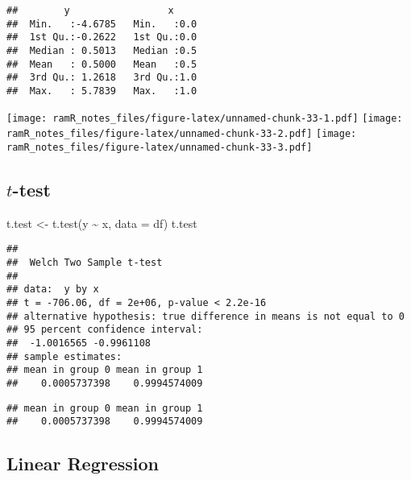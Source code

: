 \documentclass[
]{book}
\newenvironment{Shaded}{\begin{snugshade}}{\end{snugshade}}
\newcommand{\AttributeTok}[1]{\textcolor[rgb]{0.77,0.63,0.00}{#1}}
\newcommand{\FunctionTok}[1]{\textcolor[rgb]{0.00,0.00,0.00}{#1}}
\newcommand{\NormalTok}[1]{#1}
\newcommand{\OtherTok}[1]{\textcolor[rgb]{0.56,0.35,0.01}{#1}}
\newcommand{\SpecialCharTok}[1]{\textcolor[rgb]{0.00,0.00,0.00}{#1}}
\theoremstyle{definition}
\theoremstyle{definition}
\theoremstyle{definition}
\theoremstyle{remark}
\begin{document}
\begin{verbatim}
##        y                 x      
##  Min.   :-4.6785   Min.   :0.0  
##  1st Qu.:-0.2622   1st Qu.:0.0  
##  Median : 0.5013   Median :0.5  
##  Mean   : 0.5000   Mean   :0.5  
##  3rd Qu.: 1.2618   3rd Qu.:1.0  
##  Max.   : 5.7839   Max.   :1.0
\end{verbatim}

\texttt{[image: ramR\_notes\_files/figure-latex/unnamed-chunk-33-1.pdf]} \texttt{[image: ramR\_notes\_files/figure-latex/unnamed-chunk-33-2.pdf]} \texttt{[image: ramR\_notes\_files/figure-latex/unnamed-chunk-33-3.pdf]}

\hypertarget{t-test}{%
\subsection{\texorpdfstring{\(t\)-test}{t-test}}\label{t-test}}

\begin{Shaded}
\begin{Highlighting}[]
\NormalTok{t.test }\OtherTok{\textless{}{-}} \FunctionTok{t.test}\NormalTok{(y }\SpecialCharTok{\textasciitilde{}}\NormalTok{ x, }\AttributeTok{data =}\NormalTok{ df)}
\NormalTok{t.test}
\end{Highlighting}
\end{Shaded}

\begin{verbatim}
## 
##  Welch Two Sample t-test
## 
## data:  y by x
## t = -706.06, df = 2e+06, p-value < 2.2e-16
## alternative hypothesis: true difference in means is not equal to 0
## 95 percent confidence interval:
##  -1.0016565 -0.9961108
## sample estimates:
## mean in group 0 mean in group 1 
##    0.0005737398    0.9994574009
\end{verbatim}

\begin{Shaded}
\end{Shaded}

\begin{verbatim}
## mean in group 0 mean in group 1 
##    0.0005737398    0.9994574009
\end{verbatim}

\hypertarget{linear-regression}{%
\subsection{Linear Regression}\label{linear-regression}}
\end{document}
